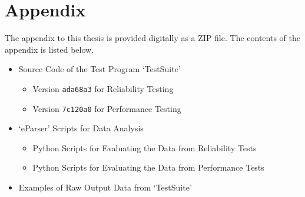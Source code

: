 \chapter{Appendix}
The appendix to this thesis is provided digitally as a ZIP file. The contents of the appendix is listed below.

\begin{itemize}
	\item Source Code of the Test Program `TestSuite'
		\begin{itemize}
			\item Version \texttt{ada68a3} for Reliability Testing
			\item Version \texttt{7c120a0} for Performance Testing
		\end{itemize}
	\item `eParser' Scripts for Data Analysis
		\begin{itemize}
			\item Python Scripts for Evaluating the Data from Reliability Tests
			\item Python Scripts for Evaluating the Data from Performance Tests
		\end{itemize}
	\item Examples of Raw Output Data from `TestSuite'
\end{itemize}